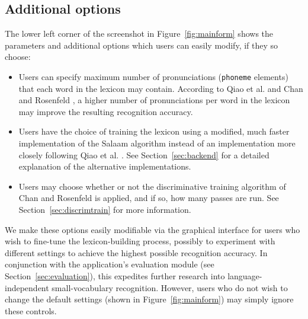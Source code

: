 \documentclass[11pt]{article}
\begin{document}



\subsection{Additional options}
\label{sec:options}

The lower left corner of the screenshot in Figure~\ref{fig:mainform} shows the parameters and additional options which users can easily modify, if they so choose:
\begin{itemize}
\item Users can specify maximum number of pronunciations (\texttt{phoneme} elements) that each word in the lexicon may contain. According to Qiao et al.  and Chan and Rosenfeld , a higher number of pronunciations per word in the lexicon may improve the resulting recognition accuracy.
\item Users have the choice of training the lexicon using a modified, much faster implementation of the Salaam algorithm instead of an implementation more closely following Qiao et al. . See Section~\ref{sec:backend} for a detailed explanation of the alternative implementations.
\item Users may choose whether or not the discriminative training algorithm of Chan and Rosenfeld  is applied, and if so, how many passes are run. See Section~\ref{sec:discrimtrain} for more information.
\end{itemize}
We make these options easily modifiable via the graphical interface for users who wish to fine-tune the lexicon-building process, possibly to experiment with different settings to achieve the highest possible recognition accuracy. In conjunction with the application's evaluation module (see Section~\ref{sec:evaluation}), this expedites further research into language-independent small-vocabulary recognition. However, users who do not wish to change the default settings (shown in Figure~\ref{fig:mainform}) may simply ignore these controls.
\end{document}
